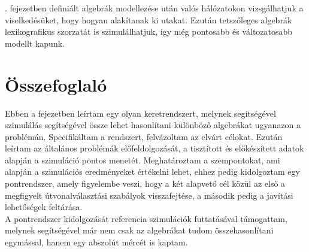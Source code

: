   . fejezetben definiált algebrák modellezése után valós hálózatokon vizsgálhatjuk a viselkedésüket, hogy hogyan alakítanak ki utakat. Ezután tetszőleges algebrák lexikografikus szorzatát is szimulálhatjuk, így még pontosabb és változatosabb modellt kapunk.

  \section{Összefoglaló}
  Ebben a fejezetben leírtam egy olyan keretrendszert, melynek segítségével szimulálás segítségével össze lehet hasonlítani különböző algebrákat ugyanazon a problémán. Specifikáltam a rendszert, felvázoltam az elvárt célokat. Ezután leírtam az általános problémák előfeldolgozását, a tisztított és előkészített adatok alapján a szimuláció pontos menetét. Meghatároztam a szempontokat, ami alapján a szimulációs eredményeket értékelni lehet, ehhez pedig kidolgoztam egy pontrendszer, amely figyelembe veszi, hogy a két alapvető cél közül az első a megfigyelt útvonalválasztási szabályok visszafejtése, a második pedig a javítási lehetőségek feltárása.\\
  A pontrendszer kidolgozását referencia szimulációk futtatásával támogattam, melynek segítségével már nem csak az algebrákat tudom összehasonlítani egymással, hanem egy abszolút mércét is kaptam.
